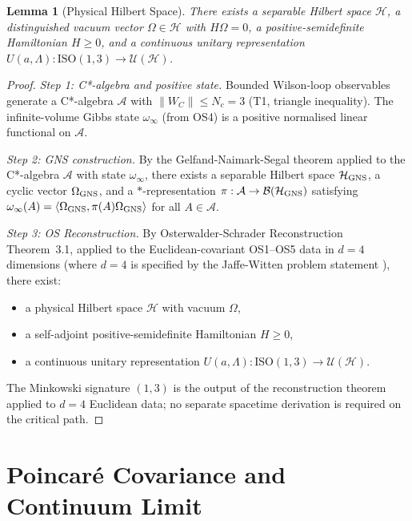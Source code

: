 \documentclass[11pt,a4paper]{article}
\newtheorem{lemma}[theorem]{Lemma}
\begin{document}
\begin{lemma}[Physical Hilbert Space]\label{lem:hilbert}
There exists a separable Hilbert space $\mathcal{H}$, a distinguished vacuum
vector $\Omega \in \mathcal{H}$ with $H\Omega = 0$, a positive-semidefinite
Hamiltonian $H \geq 0$, and a continuous unitary representation
$U(a,\Lambda):\mathrm{ISO}(1,3) \to \mathcal{U}(\mathcal{H})$.
\end{lemma}

\begin{proof}
\emph{Step 1: C*-algebra and positive state.}
Bounded Wilson-loop observables generate a C*-algebra
$\mathcal{A}$ with $\|W_C\| \leq N_c = 3$ (T1, triangle inequality).
The infinite-volume Gibbs state $\omega_\infty$ (from OS4) is a positive
normalised linear functional on $\mathcal{A}$.

\emph{Step 2: GNS construction.}
By the Gelfand-Naimark-Segal theorem \cite{GN43, Se47} applied to the
C*-algebra $\mathcal{A}$ with state $\omega_\infty$, there exists a
separable Hilbert space $\mathcal{H}_{\rm GNS}$, a cyclic vector $\Omega_{\rm GNS}$,
and a $*$-representation $\pi:\mathcal{A}\to\mathcal{B}(\mathcal{H}_{\rm GNS})$
satisfying
$\omega_\infty(A) = \langle\Omega_{\rm GNS}, \pi(A)\Omega_{\rm GNS}\rangle$
for all $A \in \mathcal{A}$.

\emph{Step 3: OS Reconstruction.}
By Osterwalder-Schrader Reconstruction \cite{OS73, OS75} Theorem~3.1,
applied to the Euclidean-covariant OS1--OS5 data in $d = 4$ dimensions
(where $d=4$ is specified by the Jaffe-Witten problem statement \cite{JW06}),
there exist:
\begin{itemize}
\item a physical Hilbert space $\mathcal{H}$ with vacuum $\Omega$,
\item a self-adjoint positive-semidefinite Hamiltonian $H \geq 0$,
\item a continuous unitary representation
  $U(a,\Lambda):\mathrm{ISO}(1,3) \to \mathcal{U}(\mathcal{H})$.
\end{itemize}
The Minkowski signature $(1,3)$ is the output of the reconstruction theorem
applied to $d=4$ Euclidean data; no separate spacetime derivation is required
on the critical path.
\end{proof}

\section{Poincar\'{e} Covariance and Continuum Limit}
\label{sec:poincare}
\end{document}
